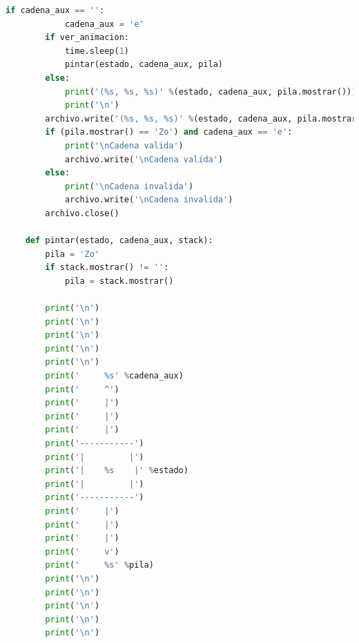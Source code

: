 \begin{lstlisting}[language=Python]
	    if cadena_aux == '':
	        cadena_aux = 'e'
	    if ver_animacion:
	        time.sleep(1)
	        pintar(estado, cadena_aux, pila)
	    else:
	        print('(%s, %s, %s)' %(estado, cadena_aux, pila.mostrar()))
	        print('\n')
	    archivo.write('(%s, %s, %s)' %(estado, cadena_aux, pila.mostrar()))
	    if (pila.mostrar() == 'Zo') and cadena_aux == 'e':
	        print('\nCadena valida')
	        archivo.write('\nCadena valida')
	    else:
	        print('\nCadena invalida')
	        archivo.write('\nCadena invalida')
	    archivo.close()

	def pintar(estado, cadena_aux, stack):
	    pila = 'Zo'
	    if stack.mostrar() != '':
	        pila = stack.mostrar()

	    print('\n')
	    print('\n')
	    print('\n')
	    print('\n')
	    print('\n')
	    print('     %s' %cadena_aux)
	    print('     ^')
	    print('     |')
	    print('     |')
	    print('     |')
	    print('-----------')
	    print('|         |')
	    print('|    %s    |' %estado)
	    print('|         |')
	    print('-----------')
	    print('     |')
	    print('     |')
	    print('     |')
	    print('     v')
	    print('     %s' %pila)
	    print('\n')
	    print('\n')
	    print('\n')
	    print('\n')
	    print('\n')
	\end{lstlisting}
